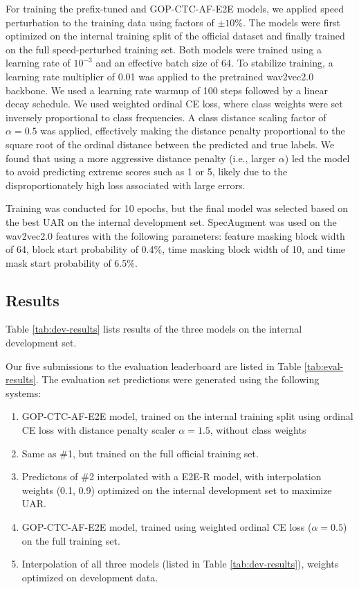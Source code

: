 \documentclass{article}
\begin{document}
For training the prefix-tuned and GOP-CTC-AF-E2E models, we applied speed perturbation to the training data using factors of $\pm10\%$. The models were first optimized on the internal training split of the official dataset and finally trained on the full speed-perturbed training set. Both models were trained using a learning rate of $10^{-3}$ and an effective batch size of 64. To stabilize training, a learning rate multiplier of 0.01 was applied to the pretrained wav2vec2.0 backbone. We used a learning rate warmup of 100 steps followed by a linear decay schedule. 
We used weighted ordinal CE loss, where class weights were set inversely proportional to class frequencies. A class distance scaling factor of $\alpha = 0.5$ was applied, effectively making the distance penalty proportional to the square root of the ordinal distance between the predicted and true labels. We found that using a more aggressive distance penalty (i.e., larger $\alpha$) led the model to avoid predicting extreme scores such as 1 or 5, likely due to the disproportionately high loss associated with large errors.


Training was conducted for 10 epochs, but the final model  was selected based on the best UAR on the internal development set. 
SpecAugment was used on the wav2vec2.0 features with the following parameters: feature masking block width of 64, block start probability of 0.4\%, time masking block width of 10, and time mask start probability of 6.5\%. 

\subsection{Results}

Table \ref{tab:dev-results} lists results of the three models on the internal development set.

Our five submissions to the evaluation leaderboard are listed in Table \ref{tab:eval-results}. The evaluation set predictions were generated using the following systems:
\begin{enumerate}[noitemsep,topsep=2pt,parsep=5pt,partopsep=2pt]
\item GOP-CTC-AF-E2E model, trained on the internal training split using ordinal CE loss with distance penalty scaler $\alpha = 1.5$, without class weights
\item Same as \#1, but trained on the full official training set. 
\item Predictons of \#2 interpolated with a E2E-R model, with interpolation weights (0.1, 0.9) optimized on the internal development set to maximize UAR.
\item GOP-CTC-AF-E2E model, trained using weighted ordinal CE loss ($\alpha=0.5$) on the full training set.
\item Interpolation of all three models (listed in Table \ref{tab:dev-results}), weights optimized on development data.
\end{enumerate}
\end{document}

